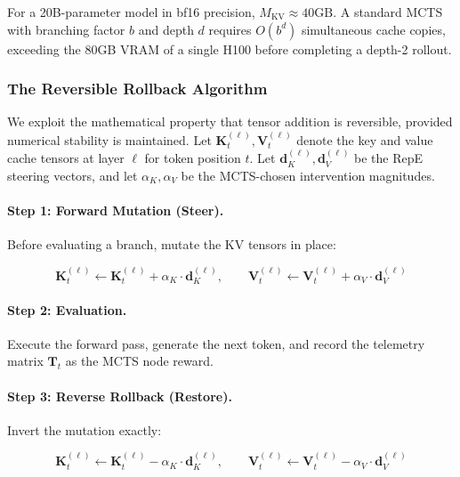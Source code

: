 \documentclass{article}
\begin{document}
For a 20B-parameter model in bf16 precision, $M_{\text{KV}} \approx 40\text{GB}$. A standard MCTS with branching factor $b$ and depth $d$ requires $O(b^d)$ simultaneous cache copies, exceeding the 80GB VRAM of a single H100 before completing a depth-2 rollout.

\subsubsection{The Reversible Rollback Algorithm}

We exploit the mathematical property that tensor addition is reversible, provided numerical stability is maintained. Let $\mathbf{K}_t^{(\ell)}, \mathbf{V}_t^{(\ell)}$ denote the key and value cache tensors at layer $\ell$ for token position $t$. Let $\mathbf{d}_K^{(\ell)}, \mathbf{d}_V^{(\ell)}$ be the RepE steering vectors, and let $\alpha_K, \alpha_V$ be the MCTS-chosen intervention magnitudes.

\paragraph{Step 1: Forward Mutation (Steer).} Before evaluating a branch, mutate the KV tensors in place:

\begin{equation}
\mathbf{K}_t^{(\ell)} \leftarrow \mathbf{K}_t^{(\ell)} + \alpha_K \cdot \mathbf{d}_K^{(\ell)}, \qquad \mathbf{V}_t^{(\ell)} \leftarrow \mathbf{V}_t^{(\ell)} + \alpha_V \cdot \mathbf{d}_V^{(\ell)}
\label{eq:forward_mutation}
\end{equation}

\paragraph{Step 2: Evaluation.} Execute the forward pass, generate the next token, and record the telemetry matrix $\mathbf{T}_t$ as the MCTS node reward.

\paragraph{Step 3: Reverse Rollback (Restore).} Invert the mutation exactly:

\begin{equation}
\mathbf{K}_t^{(\ell)} \leftarrow \mathbf{K}_t^{(\ell)} - \alpha_K \cdot \mathbf{d}_K^{(\ell)}, \qquad \mathbf{V}_t^{(\ell)} \leftarrow \mathbf{V}_t^{(\ell)} - \alpha_V \cdot \mathbf{d}_V^{(\ell)}
\label{eq:reverse_rollback}
\end{equation}
\end{document}
